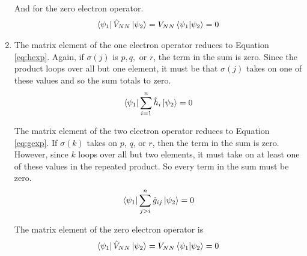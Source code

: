 \documentclass[final,3p,times,twocolumn]{elsarticle}
\begin{document}
\begin{enumerate}
	And for the zero electron operator.
	\begin{gather}
	\bra{\psi_1} \hat V_{NN} \ket{\psi_2} = V_{NN}\bra{\psi_1}\ket{\psi_2} = 0
	\end{gather}
	
	\item The matrix element of the one electron operator reduces to Equation \eqref{eq:hexp}. Again, if $\sigma(j)$ is $p, q,$ or $r$, the term in the sum is zero. Since the product loops over all but one element, it must be that $\sigma(j)$ takes on one of these values and so the sum totals to zero.
		\begin{equation}
	\bra{\psi_1}\sum_{i=1}^n \hat h_i \ket{\psi_2} = 0
	\end{equation}
	
	The matrix element of the two electron operator reduces to Equation \eqref{eq:gexp}. If $\sigma(k)$ takes on $p$, $q$, or $r$, then the term in the sum is zero. However, since $k$ loops over all but two elements, it must take on at least one of these values in the repeated product. So every term in the sum must be zero.
		\begin{equation}
	\bra{\psi_1}\sum_{j>i}^n \hat g_{ij} \ket{\psi_2} = 0
	\end{equation}
	
	The matrix element of the zero electron operator is
		\begin{gather}
	\bra{\psi_1} \hat V_{NN} \ket{\psi_2} = V_{NN}\bra{\psi_1}\ket{\psi_2} = 0
	\end{gather}
	
\end{enumerate}














\end{document}
